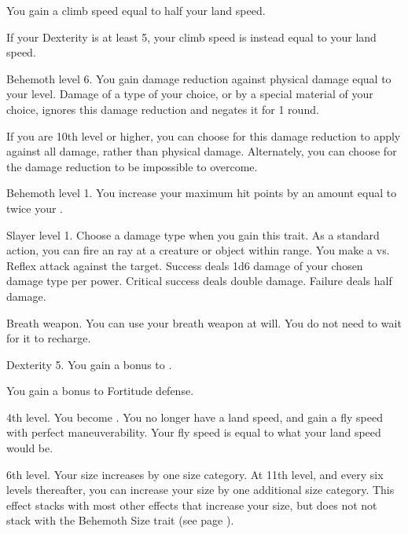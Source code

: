     \featben You gain a climb speed equal to half your land speed.

    If your Dexterity is at least 5, your climb speed is instead equal to your land speed.

    \featpre Behemoth level 6.
    \featben You gain damage reduction against physical damage equal to your level.
    Damage of a type of your choice, or by a special material of your choice, ignores this damage reduction and negates it for 1 round.

    If you are 10th level or higher, you can choose for this damage reduction to apply against all damage, rather than physical damage.
    Alternately, you can choose for the damage reduction to be impossible to overcome.

    \featpre Behemoth level 1.
    \featben You increase your maximum hit points by an amount equal to twice your .

    \featpre Slayer level 1.
     Choose a damage type when you gain this trait.
    \featben As a standard action, you can fire an ray at a creature or object within \rngclose range.
    You make a  vs. Reflex attack against the target.
    Success deals 1d6 damage of your chosen damage type per power.
    Critical success deals double damage.
    Failure deals half damage.

    \featpre Breath weapon.
    \featben You can use your breath weapon at will.
    You do not need to wait for it to recharge.

    \featpre Dexterity 5.
    \featben You gain a  bonus to .

    \featben You gain a  bonus to Fortitude defense.

    \featpre 4th level.
    \featben You become .
    You no longer have a land speed, and gain a fly speed with perfect maneuverability.
    Your fly speed is equal to what your land speed would be.

    \featpre 6th level.
    \featben Your size increases by one size category.
    At 11th level, and every six levels thereafter, you can increase your size by one additional size category.
    This effect stacks with most other effects that increase your size, but does not not stack with the Behemoth Size trait (see page ).

